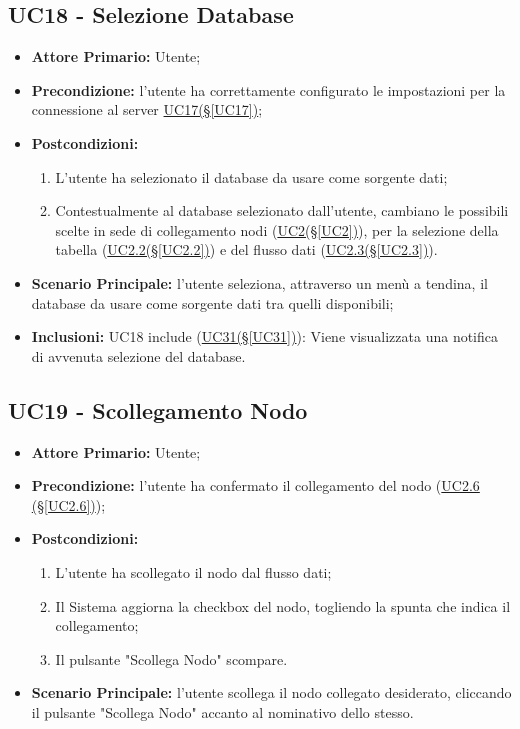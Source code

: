 \pagebreak

\subsection{UC18 - Selezione Database}\label{UC18}
\begin{itemize}
	\item \textbf{Attore Primario:} Utente;
	\item \textbf{Precondizione:} l'utente ha correttamente configurato le impostazioni per la connessione al server \hyperref[UC17]{UC17(§\ref*{UC17})};
	\item \textbf{Postcondizioni:}
	\begin{enumerate}
		\item L'utente ha selezionato il database da usare come sorgente dati;
		\item Contestualmente al database selezionato dall'utente, cambiano le possibili scelte in sede di collegamento nodi (\hyperref[UC2]{UC2(§\ref*{UC2})}), per la selezione della tabella (\hyperref[UC2.2]{UC2.2(§\ref*{UC2.2})}) e del flusso dati (\hyperref[UC2.3]{UC2.3(§\ref*{UC2.3})}).
	\end{enumerate}
	\item \textbf{Scenario Principale:} l'utente seleziona, attraverso un menù a tendina, il database da usare come sorgente dati tra quelli disponibili;
	\item \textbf{Inclusioni:} UC18 include (\hyperref[UC31]{UC31(§\ref*{UC31})}): Viene visualizzata una notifica di avvenuta selezione del database.
\end{itemize}

\pagebreak

\subsection{UC19 - Scollegamento Nodo}\label{UC19}
\begin{itemize}
	\item \textbf{Attore Primario:} Utente;
	\item \textbf{Precondizione:} l'utente ha confermato il collegamento del nodo (\hyperref[UC2.6]{UC2.6 									(§\ref*{UC2.6})});
	\item \textbf{Postcondizioni:}
	\begin{enumerate}
		\item L'utente ha scollegato il nodo dal flusso dati;
		\item Il Sistema aggiorna la checkbox del nodo, togliendo la spunta che indica il collegamento;
		\item Il pulsante "Scollega Nodo" scompare.
	\end{enumerate}
	\item \textbf{Scenario Principale:} l'utente scollega il nodo collegato desiderato, cliccando il pulsante "Scollega Nodo" accanto al nominativo dello stesso.
\end{itemize}

